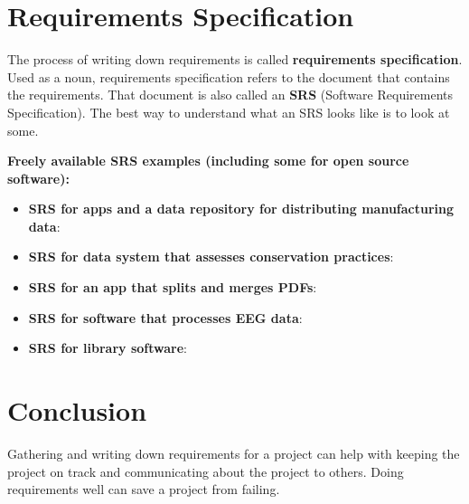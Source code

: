 \section{Requirements Specification}

\marginpar{\requirementsSpecificationDef}The process of writing down requirements is called \textbf{requirements specification}. Used as a noun, requirements specification refers to the document that contains the requirements. That document is also called an \textbf{SRS} (Software Requirements Specification). The best way to understand what an SRS looks like is to look at some.

\spacer
\noindent\textbf{Freely available SRS examples (including some for open source software):}
\spacer

\begin{itemize}
    \item \marginpar{\srsDef\margindivider}\textbf{SRS for apps and a data repository for distributing manufacturing data}: \\
    \item \textbf{SRS for data system that assesses conservation practices}: \\
    \item \textbf{SRS for an app that splits and merges PDFs}: \\
    \item \textbf{SRS for software that processes EEG data}: \\
    \item \textbf{SRS for library software}: 
\end{itemize}

\nomargins

\section{Conclusion}
Gathering and writing down requirements for a project can help with keeping the project on track and communicating about the project to others. Doing requirements well can save a project from failing.

